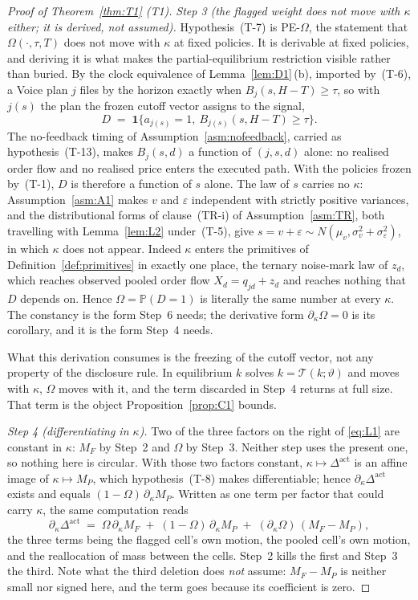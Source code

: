 \documentclass[11pt]{article}
\newcommand{\Prb}{\mathbb{P}}
\newcommand{\ind}{\mathbf{1}}
\newcommand{\Dact}{\Delta^{\mathrm{act}}}
\newcommand{\Tmap}{\mathcal{T}}
\begin{document}
\begin{proof}[Proof of Theorem~\ref{thm:T1} (T1)]
\emph{Step 3 (the flagged weight does not move with $\kappa$ either; it is derived, not assumed).}
Hypothesis~(T-7) is PE-$\Omega$, the statement that $\Omega(\cdot,\tau,T)$ does not move with
$\kappa$ at fixed policies. It is derivable at fixed policies, and deriving it is what makes the
partial-equilibrium restriction visible rather than buried. By the clock equivalence of
Lemma~\ref{lem:D1}\,(b), imported by~(T-6), a Voice plan $j$ files by the horizon exactly when
$B_j(s,H-T) \ge \tau$, so with $j(s)$ the plan the frozen cutoff vector assigns to the signal,
\[
D \;=\; \ind\bigl\{a_{j(s)} = 1,\ B_{j(s)}(s,H-T) \ge \tau\bigr\}.
\]
The no-feedback timing of Assumption~\ref{asm:nofeedback}, carried as hypothesis~(T-13), makes
$B_j(s,d)$ a function of $(j,s,d)$ alone: no realised order flow and no realised price enters the
executed path. With the policies frozen by~(T-1), $D$ is therefore a function of $s$ alone. The law
of $s$ carries no $\kappa$: Assumption~\ref{asm:A1} makes $v$ and $\varepsilon$ independent with
strictly positive variances, and the distributional forms of clause~(TR-i) of
Assumption~\ref{asm:TR}, both travelling with Lemma~\ref{lem:L2} under~(T-5), give
$s = v + \varepsilon \sim N(\mu_v,\sigma_v^2+\sigma_\varepsilon^2)$, in which $\kappa$ does not
appear. Indeed $\kappa$ enters the primitives of Definition~\ref{def:primitives} in exactly one
place, the ternary noise-mark law of $z_d$, which reaches observed pooled order flow
$X_d = q_{jd} + z_d$ and reaches nothing that $D$ depends on. Hence $\Omega = \Prb(D=1)$ is
literally the same number at every $\kappa$. The constancy is the form Step~6 needs; the derivative
form $\partial_\kappa\Omega = 0$ is its corollary, and it is the form Step~4 needs.

What this derivation consumes is the freezing of the cutoff vector, not any property of the
disclosure rule. In equilibrium $k$ solves $k = \Tmap(k;\vartheta)$ and moves with $\kappa$,
$\Omega$ moves with it, and the term discarded in Step~4 returns at full size. That term is the
object Proposition~\ref{prop:C1} bounds.

\emph{Step 4 (differentiating in $\kappa$).} Two of the three factors on the right of \eqref{eq:L1}
are constant in $\kappa$: $M_F$ by Step~2 and $\Omega$ by Step~3. Neither step uses the present one,
so nothing here is circular. With those two factors constant, $\kappa \mapsto \Dact$ is an affine
image of $\kappa \mapsto M_P$, which hypothesis~(T-8) makes differentiable; hence
$\partial_\kappa\Dact$ exists and equals $(1-\Omega)\,\partial_\kappa M_P$. Written as one term per
factor that could carry $\kappa$, the same computation reads
\begin{equation}
\label{eq:T1-three}
\partial_\kappa\Dact
\;=\; \Omega\,\partial_\kappa M_F
\;+\; (1-\Omega)\,\partial_\kappa M_P
\;+\; (\partial_\kappa\Omega)\,(M_F - M_P),
\end{equation}
the three terms being the flagged cell's own motion, the pooled cell's own motion, and the
reallocation of mass between the cells. Step~2 kills the first and Step~3 the third. Note what the
third deletion does \emph{not} assume: $M_F - M_P$ is neither small nor signed here, and the term
goes because its coefficient is zero.


\end{proof}
\end{document}
